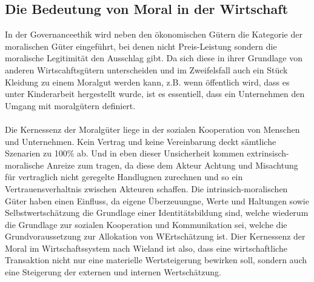 \documentclass[12pt]{article}
\begin{document}
\subsection{Die Bedeutung von Moral in der Wirtschaft}
In der Governanceethik wird neben den ökonomischen Gütern die Kategorie der moralischen Güter eingeführt, bei denen nicht Preis-Leistung sondern die moralische Legitimität den Ausschlag gibt. Da sich diese in ihrer Grundlage von anderen Wirtscahftsgütern unterscheiden und im Zweifelsfall auch ein Stück Kleidung zu einem Moralgut werden kann, z.B. wenn öffentlich wird, dass es unter Kinderarbeit hergestellt wurde, ist es essentiell, dass ein Unternehmen den Umgang mit moralgütern definiert.\\
\\
Die Kernessenz der Moralgüter liege in der sozialen Kooperation von Menschen und Unternehmen. Kein Vertrag und keine Vereinbarung deckt sämtliche Szenarien zu 100\% ab. Und in eben dieser Unsicherheit kommen extrinsisch-moralische Anreize zum tragen, da diese dem Akteur Achtung und Misachtung für vertraglich nicht geregelte Handlugnen zurechnen und so ein Vertrauensverhaltnis zwischen Akteuren schaffen. Die intrinsich-moralischen Güter haben einen Einfluss, da eigene Überzeuungne, Werte und Haltungen sowie Selbstwertschätzung die Grundlage einer Identitätsbildung sind, welche wiederum die Grundlage zur sozialen Kooperation und Kommunikation sei, welche die Grundvoraussetzung zur Allokation von WErtschätzung ist. Dier Kernessenz der Moral im Wirtschaftssystem nach Wieland ist also, dass eine wirtschaftliche Transaktion nicht nur eine materielle Wertsteigerung bewirken soll, sondern auch eine Steigerung der externen und internen Wertschätzung.
\end{document}
